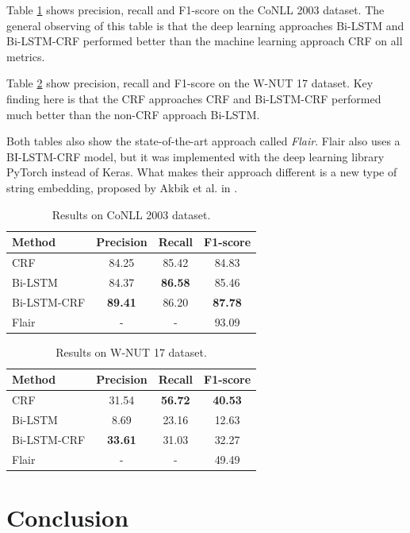 \documentclass[12pt]{book}
\begin{document}
	Table \ref{tab:res_conll} shows precision, recall and F1-score on the CoNLL 2003 dataset. The general observing of this table is that the deep learning approaches Bi-LSTM and Bi-LSTM-CRF performed better than the machine learning approach CRF on all metrics.
	
	Table \ref{tab:res_wnut} show precision, recall and F1-score on the W-NUT 17 dataset. Key finding here is that the CRF approaches CRF and Bi-LSTM-CRF performed much better than the non-CRF approach Bi-LSTM.
	
	Both tables also show the state-of-the-art approach called \textit{Flair}. Flair also uses a BI-LSTM-CRF model, but it was implemented with the deep learning library PyTorch \cite{pytorch} instead of Keras. What makes their approach different is a new type of string embedding, proposed by Akbik et al. in \cite{akbik2018contextual}.
	
	\begin{table}
		\begin{center}
			\begin{tabular}{| l | c | c | c |}
				\hline
				Method & Precision & Recall & F1-score \\ \hline
				CRF & 84.25 & 85.42 & 84.83 \\ \hline
				Bi-LSTM & 84.37 & \textbf{86.58} & 85.46 \\ \hline
				Bi-LSTM-CRF & \textbf{89.41} & 86.20 & \textbf{87.78} \\ \hline
				Flair & - & - & 93.09 \\ \hline
			\end{tabular}
		\end{center}
		\caption{Results on CoNLL 2003 dataset.}
		\label{tab:res_conll}
	\end{table}
	\begin{table}
		\begin{center}
			\begin{tabular}{| l | c | c | c |}
				\hline
				Method & Precision & Recall & F1-score \\ \hline
				CRF & 31.54 & \textbf{56.72} & \textbf{40.53} \\ \hline
				Bi-LSTM & 8.69 & 23.16 & 12.63 \\ \hline
				Bi-LSTM-CRF & \textbf{33.61} & 31.03 & 32.27 \\ \hline
				Flair & - & - & 49.49 \\ \hline
			\end{tabular}
		\end{center}
		\caption{Results on W-NUT 17 dataset.}
		\label{tab:res_wnut}
	\end{table}

	\chapter{Conclusion}
	\label{chap:conclusion}
	
	
	
\end{document}

